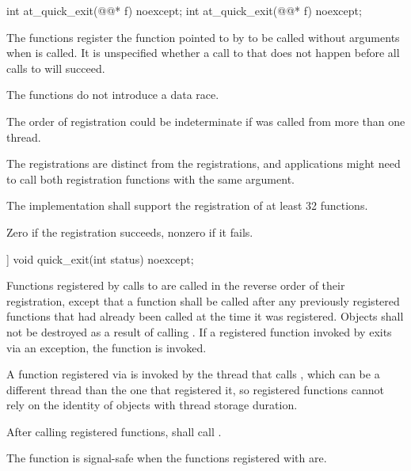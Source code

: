 %
\begin{itemdecl}
int at_quick_exit(@@* f) noexcept;
int at_quick_exit(@@* f) noexcept;
\end{itemdecl}

\begin{itemdescr}
\pnum
\effects
The  functions register the function pointed to by 
to be called without arguments when  is called.
It is unspecified whether a call to  that does not
happen before all calls to  will succeed.
\begin{note}
The
 functions do not introduce a
data race.
\end{note}
\begin{note}
The order of registration could be indeterminate if  was called from more
than one thread.
\end{note}
\begin{note}
The
 registrations are distinct from the  registrations,
and applications might need to call both registration functions with the same argument.
\end{note}

\pnum
\implimits
The implementation shall support the registration of at least 32 functions.

\pnum
\returns
Zero if the registration succeeds, nonzero if it fails.
\end{itemdescr}

%
\begin{itemdecl}
[[noreturn]] void quick_exit(int status) noexcept;
\end{itemdecl}

\begin{itemdescr}
\pnum
\effects
Functions registered by calls to  are called in the
reverse order of their registration, except that a function shall be called after any
previously registered functions that had already been called at the time it was
registered. Objects shall not be destroyed as a result of calling .
If a registered function invoked by  exits via an exception,
the function  is invoked.%
\begin{note}
A function registered via 
is invoked by the thread that calls ,
which can be a different thread
than the one that registered it, so registered functions cannot rely on the identity
of objects with thread storage duration.
\end{note}
After calling registered functions,  shall call .

\pnum
\remarks
{}%
The function  is signal-safe
when the functions registered with  are.
\end{itemdescr}

